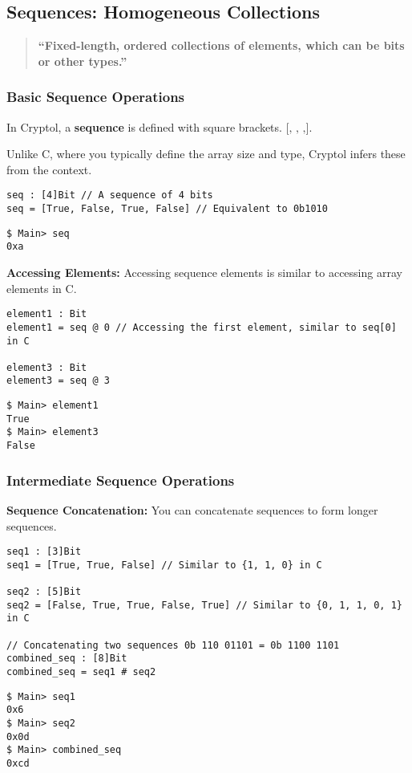 \newpage
\subsection{Sequences: Homogeneous Collections}
\begin{quote}\bf
``Fixed-length, ordered collections of elements, which can be bits or other types.''
\end{quote}

\subsubsection{Basic Sequence Operations}
\begin{tcolorbox}[colframe=defcolor,title={\color{white}\bf Sequence}]
In Cryptol, a \textbf{sequence} is defined with square brackets. $\texttt{[, , ,]}$.
\end{tcolorbox}
\begin{remark}
Unlike C, where you typically define the array size and type, Cryptol infers these from the context.
\end{remark}
\begin{lstlisting}[style=cryptol]
seq : [4]Bit // A sequence of 4 bits
seq = [True, False, True, False] // Equivalent to 0b1010
\end{lstlisting}
\begin{lstlisting}[style=zsh]
$ Main> seq
0xa
\end{lstlisting}
\vspace{16pt}
\textbf{Accessing Elements:} Accessing sequence elements is similar to accessing array elements in C.
\begin{lstlisting}[style=cryptol]
element1 : Bit
element1 = seq @ 0 // Accessing the first element, similar to seq[0] in C

element3 : Bit
element3 = seq @ 3
\end{lstlisting}
\begin{lstlisting}[style=zsh]
$ Main> element1
True
$ Main> element3
False
\end{lstlisting}

\subsubsection{Intermediate Sequence Operations}
\textbf{Sequence Concatenation:} You can concatenate sequences to form longer sequences.
\begin{lstlisting}[style=cryptol]
seq1 : [3]Bit
seq1 = [True, True, False] // Similar to {1, 1, 0} in C

seq2 : [5]Bit
seq2 = [False, True, True, False, True] // Similar to {0, 1, 1, 0, 1} in C

// Concatenating two sequences 0b 110 01101 = 0b 1100 1101
combined_seq : [8]Bit
combined_seq = seq1 # seq2
\end{lstlisting}
\begin{lstlisting}[style=zsh]
$ Main> seq1
0x6
$ Main> seq2
0x0d
$ Main> combined_seq
0xcd
\end{lstlisting}

